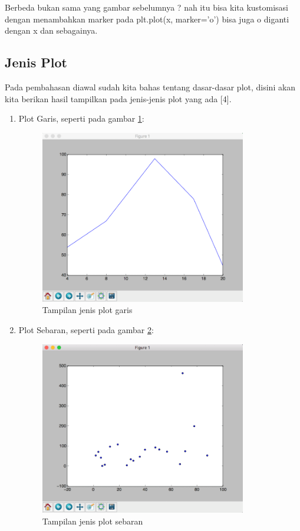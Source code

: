 Berbeda bukan sama yang gambar sebelumnya ? nah itu bisa kita kustomisasi dengan menambahkan marker pada plt.plot(x, marker='o') bisa juga o diganti dengan x dan sebagainya.

\subsection{Jenis Plot}
Pada pembahasan diawal sudah kita bahas tentang dasar-dasar plot, disini akan kita berikan hasil tampilkan pada jenis-jenis plot yang ada [4].
\begin{enumerate}
\item Plot Garis, seperti pada gambar \ref{fig:pltgaris}:
\begin{figure}[!htbp]
	\centerline{\includegraphics[width=0.85\textwidth]{figures/6/pltgaris.PNG}}
	\caption{Tampilan jenis plot garis}
	\label{fig:pltgaris}
\end{figure} 

\item Plot Sebaran, seperti pada gambar \ref{fig:pltsebaran}:
\begin{figure}[!htbp]
	\centerline{\includegraphics[width=0.85\textwidth]{figures/6/pltsebaran.PNG}}
	\caption{Tampilan jenis plot sebaran}
	\label{fig:pltsebaran}
\end{figure}


\end{enumerate}
